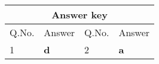 \setlength\arrayrulewidth{1pt}
\begin{table}[H]
	\centering
	
	\begin{tabular}{|p{1.5cm}|p{1.5cm}||p{1.5cm}|p{1.5cm}|}
		\hline
		\multicolumn{4}{|c|}{\textbf{Answer key}}\\\hline\hline
		\rowcolor{ocrel}Q.No.&Answer&Q.No.&Answer\\\hline
		1&\textbf{d}&2&\textbf{a}\\\hline
	\end{tabular}
\end{table}